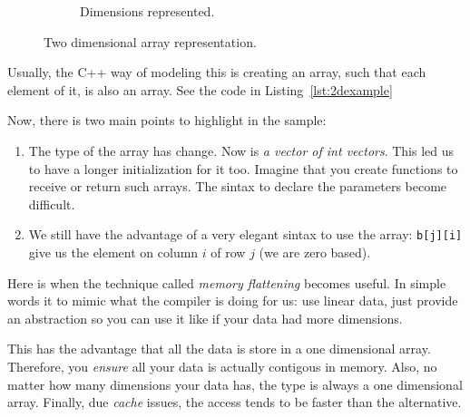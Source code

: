 \begin{figure}[htp]
\begin{subfigure}[b]{0.25\textwidth}
    \caption{Dimensions represented.}
    \label{fig:2b}
  \end{subfigure}
  \caption{Two dimensional array representation.}
  \label{fig:2D}
\end{figure}

Usually, the C++ way of modeling this is creating an array, such that each element of it, is also an array. See the code in Listing~\ref{lst:2dexample}

{\centering
\begin{minipage}{\linewidth}
\end{minipage}
\par
}
\vspace{0.5cm}
Now, there is two main points to highlight in the sample:
\begin{enumerate}

\item The type of the array has change. Now is \emph{a vector of int vectors}. This led us to have a longer initialization for it too. Imagine that you create functions to receive or return such arrays.
The sintax to declare the parameters become difficult.

 \item We still have the advantage of a very elegant sintax to use the array: \texttt{b[j][i]} give us the element on column $i$ of row $j$ (we are zero based).

 \end{enumerate}
 
Here is when the technique called \emph{memory flattening} becomes useful. In simple words it to mimic what the compiler is doing for us: use linear data, just provide an abstraction so you can use it like if your data had more dimensions.

This has the advantage that all the data is store in a one dimensional array. Therefore, you \emph{ensure} all your data is actually contigous in memory. Also, no matter how many dimensions your data has, the type is always a one dimensional array. Finally, due \emph{cache} issues, the access tends to be faster than the alternative.


